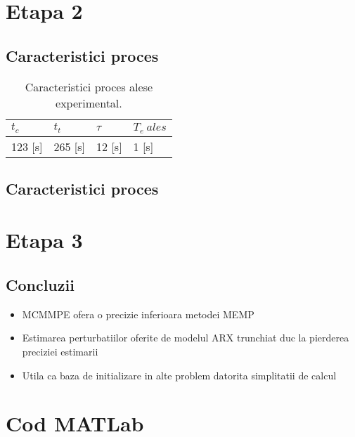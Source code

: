 \documentclass[12pt,english]{article}
\begin{document}
\section {Etapa 2}

\subsection {Caracteristici proces }
\begin{table}[H]
  \centering
  \begin{tabular}{|l|l|l|l|}
    \hline
    $t_c$ & $t_t$ & $\tau$ & $T_e\ ales$ \\
    \hline
    123 [s] & 265 [s] & 12 [s] & 1 [s] \\
    \hline
  \end{tabular}
  \caption{Caracteristici proces alese experimental.}
\end{table}

\subsection {Caracteristici proces }


\section {Etapa 3}




\newpage

\subsection {Concluzii}
\begin{itemize}
  \item MCMMPE ofera o precizie inferioara metodei MEMP
  \item Estimarea perturbatiilor oferite de modelul ARX trunchiat duc la pierderea preciziei estimarii
  \item Utila ca baza de initializare in alte problem datorita simplitatii de calcul
\end{itemize}

\section{Cod MATLab}
% 
\end{document}
